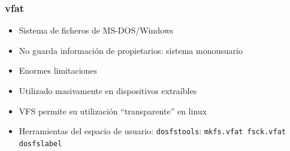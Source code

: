 \documentclass[aspectratio=169]{beamer}
\begin{document}
\begin{frame}
  \frametitle{vfat}
  \begin{itemize}
  \item Sistema de ficheros de MS-DOS/Windows
  \item No guarda información de propietarios: sistema monousuario
  \item Enormes limitaciones
  \item Utilizado masivamente en dispositivos extraíbles
  \item VFS permite su utilización ``transparente'' en linux
  \item Herramientas del espacio de usuario: \texttt{dosfstools}:
    \texttt{mkfs.vfat fsck.vfat dosfslabel}
  \end{itemize}
\end{frame}
\end{document}
